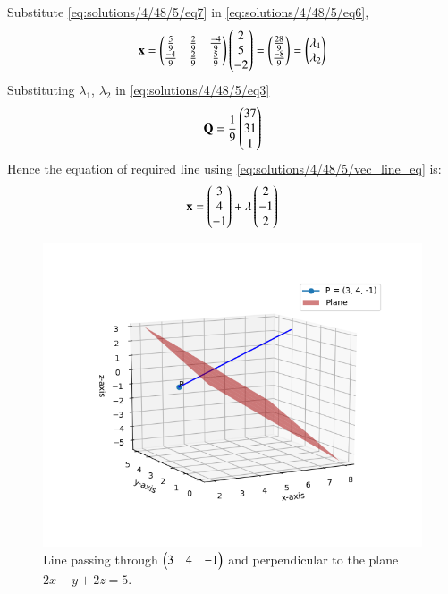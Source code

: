 Substitute \eqref{eq:solutions/4/48/5/eq7} in \eqref{eq:solutions/4/48/5/eq6},
\begin{align}\label{eq:solutions/4/48/5/eq8}
	\mathbf{x} =\begin{pmatrix}\frac{5}{9} & \frac{2}{9} & \frac{-4}{9} \\ \frac{-4}{9} & \frac{2}{9} & \frac{5}{9}\end{pmatrix}\begin{pmatrix}2\\5\\-2\end{pmatrix} = \begin{pmatrix}\frac{28}{9}\\\frac{-8}{9}\end{pmatrix} = \begin{pmatrix}\lambda_1 \\ \lambda_2\end{pmatrix}
\end{align}
Substituting $\lambda_1$, $\lambda_2$ in \eqref{eq:solutions/4/48/5/eq3}
\begin{equation}
	\mathbf{Q} = \frac{1}{9}\begin{pmatrix}37\\31\\1\end{pmatrix}
\end{equation}
Hence the equation of required line using \eqref{eq:solutions/4/48/5/vec_line_eq} is:
\begin{align}
     \mathbf{x} = \begin{pmatrix}3\\4\\-1\end{pmatrix} +\lambda\begin{pmatrix}2\\-1\\2\end{pmatrix} 
\end{align}
\begin{figure}[h]
    \centering
    \includegraphics[width = \columnwidth]{./solutions/4/48/5/assignment_8.png}
    \caption{Line passing through $\begin{pmatrix}3 & 4 & -1\end{pmatrix}$ and perpendicular to the plane $2x - y + 2z = 5$.}
    \label{eq:solutions/4/48/5/line and plane}
\end{figure}

